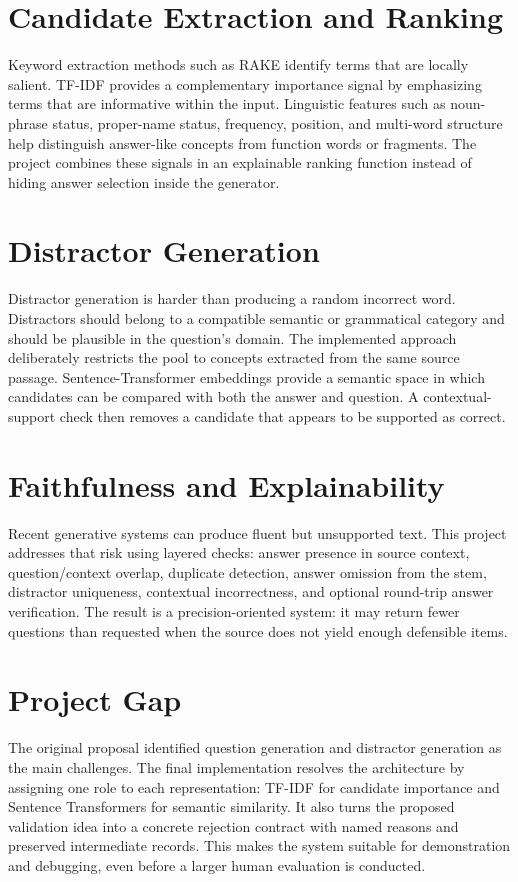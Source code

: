 \documentclass[12pt,a4paper]{report}
\begin{document}
\section{Candidate Extraction and Ranking}
Keyword extraction methods such as RAKE identify terms that are locally salient. TF-IDF provides a complementary importance signal by emphasizing terms that are informative within the input. Linguistic features such as noun-phrase status, proper-name status, frequency, position, and multi-word structure help distinguish answer-like concepts from function words or fragments. The project combines these signals in an explainable ranking function instead of hiding answer selection inside the generator.

\section{Distractor Generation}
Distractor generation is harder than producing a random incorrect word. Distractors should belong to a compatible semantic or grammatical category and should be plausible in the question's domain. The implemented approach deliberately restricts the pool to concepts extracted from the same source passage. Sentence-Transformer embeddings provide a semantic space in which candidates can be compared with both the answer and question. A contextual-support check then removes a candidate that appears to be supported as correct.

\section{Faithfulness and Explainability}
Recent generative systems can produce fluent but unsupported text. This project addresses that risk using layered checks: answer presence in source context, question/context overlap, duplicate detection, answer omission from the stem, distractor uniqueness, contextual incorrectness, and optional round-trip answer verification. The result is a precision-oriented system: it may return fewer questions than requested when the source does not yield enough defensible items.

\section{Project Gap}
The original proposal identified question generation and distractor generation as the main challenges. The final implementation resolves the architecture by assigning one role to each representation: TF-IDF for candidate importance and Sentence Transformers for semantic similarity. It also turns the proposed validation idea into a concrete rejection contract with named reasons and preserved intermediate records. This makes the system suitable for demonstration and debugging, even before a larger human evaluation is conducted.
\end{document}
